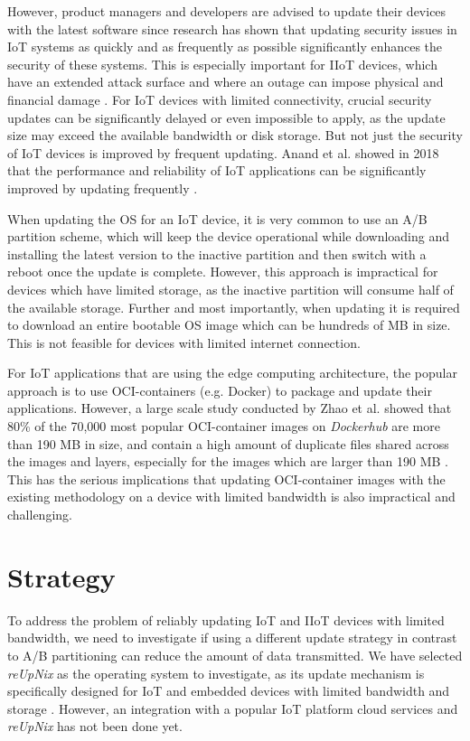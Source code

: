 However, product managers and developers are advised to update their devices with
the latest software since
research has shown that updating security issues in \ac{IoT} systems as quickly
and as frequently as possible significantly enhances the security of these systems.
This is especially important for \ac{IIoT} devices, which have an extended attack
surface and where an outage can impose physical and financial damage \cite{s20247160}.
For \ac{IoT} devices with limited connectivity, crucial security updates can be
significantly delayed or even impossible to apply, as the update size may exceed
the available bandwidth or disk storage. But not just the security of \ac{IoT}
devices is improved by frequent updating. Anand et al. showed in 2018 that the
performance and reliability of \ac{IoT} applications can be significantly improved
by updating frequently \cite{Anand2018}.

When updating the \ac{OS} for an \ac{IoT} device, it is very common to use an
A/B partition scheme, which will keep the device operational while downloading
and installing the latest version to the inactive partition and then switch with
a reboot once the update is complete. However, this approach is impractical for
devices which have limited storage, as the inactive partition will consume
half of the available storage. Further and most importantly, when updating
it is required to download an entire bootable \ac{OS} image which can be
hundreds of \ac{MB} in size. This is not feasible for devices with limited
internet connection.

For \ac{IoT} applications that are using the edge computing architecture, the popular
approach is to use \ac{OCI}-containers (e.g. Docker) to package and update
their applications.
However, a large scale study conducted by Zhao et al. showed that 80\% of the
70,000 most popular \ac{OCI}-container images on \textit{Dockerhub} are more than
190 \ac{MB} in size, and contain a high amount of duplicate files shared across the images
and layers, especially for the images which are larger than 190 \ac{MB} \cite{9242268}.
This has the serious implications that updating \ac{OCI}-container images with
the existing methodology on a device with limited bandwidth is also impractical
and challenging.
\clearpage

\section{Strategy}
To address the problem of reliably updating \ac{IoT} and \ac{IIoT}
devices with limited bandwidth, we need to investigate if using a different
update strategy in contrast to A/B partitioning can reduce the amount of data transmitted.
We have selected \textit{reUpNix} as the operating system to investigate, as its
update mechanism is specifically designed for \ac{IoT} and embedded devices with
limited bandwidth and storage \cite{gollenstede:23:lctes}. However, an integration
with a popular \ac{IoT} platform cloud services and \textit{reUpNix} has not
been done yet.

